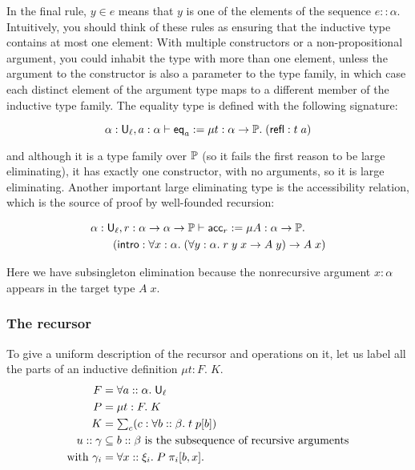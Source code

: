 In the final rule, $y\in e$ means that $y$ is one of the elements of the sequence $e::\alpha$. Intuitively, you should think of these rules as ensuring that the inductive type contains at most one element: With multiple constructors or a non-propositional argument, you could inhabit the type with more than one element, unless the argument to the constructor is also a parameter to the type family, in which case each distinct element of the argument type maps to a different member of the inductive type family. The equality type is defined with the following signature:

$$\alpha:\U_\ell,a:\alpha\vdash \mathsf{eq}_a:=\mu t:\alpha\to\P.\;(\mathsf{refl}:t\;a)$$

and although it is a type family over $\P$ (so it fails the first reason to be large eliminating), it has exactly one constructor, with no arguments, so it is large eliminating. Another important large eliminating type is the accessibility relation, which is the source of proof by well-founded recursion:

\begin{align*}
&\alpha:\U_\ell,r:\alpha\to\alpha\to\P\vdash\acc_r:=\mu A:\alpha\to\P.\\
&\qquad(\intro:\forall x:\alpha.\;(\forall y:\alpha.\;r\;y\;x\to A\;y)\to A\;x)
\end{align*}

Here we have subsingleton elimination because the nonrecursive argument $x:\alpha$ appears in the target type $A\;x$.

\subsubsection{The recursor}
To give a uniform description of the recursor and operations on it, let us label all the parts of an inductive definition $\mu t:F.\;K$.
\begin{align*}
F&=\forall a::\alpha.\;\U_\ell\\
P&=\mu t:F.\;K\\
K&=\textstyle{\sum_c(c:\forall b::\beta.\;t\;p[b])}\\
u::\gamma&\subseteq b::\beta\mbox{ is the subsequence of recursive arguments}\\
\mbox{with}\ \gamma_i&=\forall x::\xi_i.\;P\;\pi_i[b,x].
\end{align*}

